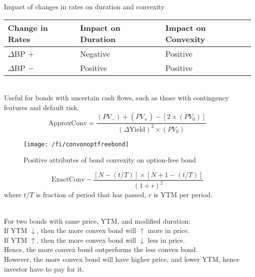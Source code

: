 \begin{flushleft}
Impact of changes in rates on duration and convexity
\begin{tabularx}{\textwidth}{p{10em}|X|X}
\hline
\rowcolor{gray!30}
Change in Rates & Impact on Duration & Impact on Convexity \\
\hline
$\Delta$BP $+$ & Negative & Positive \\
\hline
$\Delta$BP $-$ & Positive & Positive \\
\hline
\end{tabularx}
\end{flushleft}

\begin{definition} \\
Useful for bonds with uncertain cash flows, such as those with contingency features and default risk.
\begin{equation}
\text{ApproxConv} = \frac{(PV_{-}) + (PV_{+}) - [2 \times (PV_0)]}{(\Delta \text{Yield})^2 \times (PV_0)} \nonumber
\end{equation}
\end{definition}

\begin{figure}[H]
\centering
\texttt{[image: /fi/convonoptfreebond]}
\caption{Positive attributes of bond convexity on option-free bond}
\end{figure}

\begin{definition} 
\begin{equation}
\text{ExactConv} - \frac{[N - (t/T)] \times [N+1-(t/T)]}{(1+r)^2} \nonumber
\end{equation}
where $t/T$ is fraction of period that has passed, $r$ is YTM per period.
\end{definition}

\begin{remark} \\
For two bonds with same price, YTM, and modified duration:\\
If YTM $\downarrow$, then the more convex bond will $\uparrow$ more in price.\\
If YTM $\uparrow$, then the more convex bond will $\downarrow$ less in price.\\
Hence, the more convex bond outperforms the less convex bond.\\
However, the more convex bond will have higher price, and lower YTM, hence investor have to pay for it.
\end{remark}

